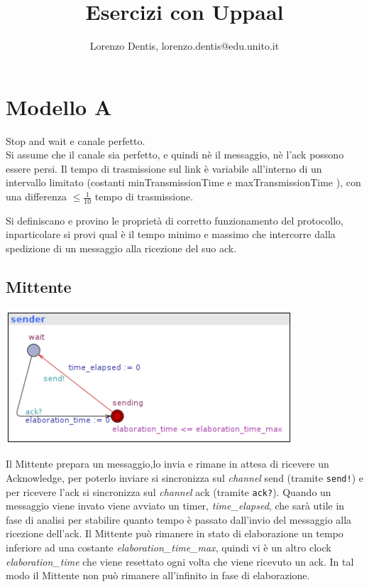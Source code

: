 \documentclass[a4paper]{article}
\newcommand{\channel}{\textit{channel }}
\begin{document}
\author{Lorenzo Dentis, lorenzo.dentis@edu.unito.it}
\title{Esercizi con Uppaal}
\maketitle
\section{Modello A}
Stop and wait e canale perfetto.\\ 
Si assume che il canale sia perfetto, e quindi nè il messaggio, nè l’ack possono essere persi. 
Il tempo di trasmissione sul link è variabile all’interno di un intervallo limitato (costanti minTransmissionTime e maxTransmissionTime ), con una differenza $\leq \frac{1}{10}$ tempo di trasmissione. 

Si definiscano e provino le proprietà di corretto funzionamento del protocollo, inparticolare si provi qual è il tempo minimo e massimo che intercorre dalla spedizione di un messaggio alla ricezione del suo ack.
\subsection{Mittente}
\begin{center}\includegraphics[width=0.8\textwidth]{1_sender.png}\end{center}
Il Mittente prepara un messaggio,lo invia e rimane in attesa di ricevere un Acknowledge, per poterlo inviare si sincronizza sul \channel send (tramite \texttt{send!}) e per ricevere l'ack si sincronizza sul \channel ack (tramite \texttt{ack?}).
Quando un messaggio viene invato viene avviato un timer, \textit{time\_elapsed}, che sarà utile in fase di analisi per stabilire quanto tempo è passato dall'invio del messaggio alla ricezione dell'ack.
Il Mittente può rimanere in stato di elaborazione un tempo inferiore ad una costante \textit{elaboration\_time\_max}, quindi vi è un altro clock \textit{elaboration\_time} che viene resettato ogni volta che viene ricevuto un ack.
In tal modo il Mittente non può rimanere all'infinito in fase di elaborazione.
\end{document}
